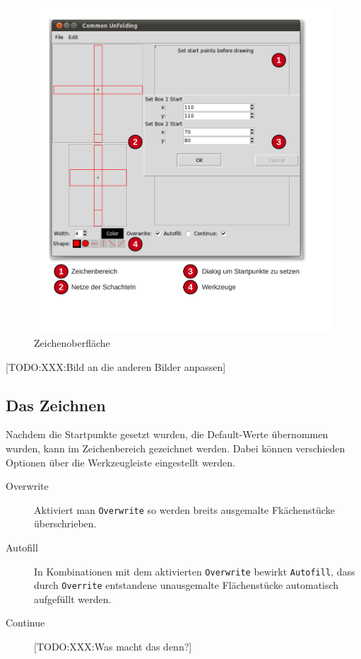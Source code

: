 \begin{figure}[htbp]
  \centering
  \includegraphics[scale=0.5]{03_pics/Zeichenbereich.pdf}
  \caption{Zeichenoberfläche}
  \label{fig:zeichenoberflaeche}
\end{figure}

[TODO:XXX:Bild an die anderen Bilder anpassen]


\subsection{Das Zeichnen}
\label{subsec:zeichnen}
Nachdem die Startpunkte gesetzt wurden, \bzw die Default-Werte übernommen wurden, kann im Zeichenbereich gezeichnet werden. Dabei können verschieden Optionen über die Werkzeugleiste eingestellt werden.

\begin{description}
  \item [Overwrite] Aktiviert man \texttt{Overwrite} so werden breits ausgemalte Fkächenstücke überschrieben.
  \item [Autofill] In Kombinationen mit dem aktivierten \texttt{Overwrite} bewirkt \texttt{Autofill}, dass durch \texttt{Overrite} entstandene unausgemalte Flächenstücke automatisch aufgefüllt werden.
  \item [Continue] [TODO:XXX:Was macht das denn?]
\end{description}


